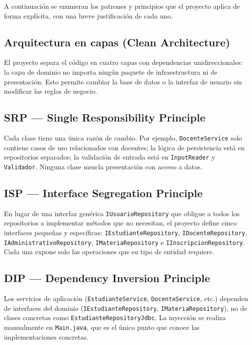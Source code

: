 \documentclass[12pt,a4paper]{article}
\begin{document}
A continuación se enumeran los patrones y principios que el proyecto aplica
de forma explícita, con una breve justificación de cada uno.

\subsection*{Arquitectura en capas (Clean Architecture)}

El proyecto separa el código en cuatro capas con dependencias
unidireccionales: la capa de dominio no importa ningún paquete de
infraestructura ni de presentación. Esto permite cambiar la base de datos o
la interfaz de usuario sin modificar las reglas de negocio.

\subsection*{SRP --- Single Responsibility Principle}

Cada clase tiene una única razón de cambio. Por ejemplo,
\texttt{DocenteService} solo contiene casos de uso relacionados con
docentes; la lógica de persistencia está en repositorios separados; la
validación de entrada está en \texttt{InputReader} y \texttt{Validador}.
Ninguna clase mezcla presentación con acceso a datos.

\subsection*{ISP --- Interface Segregation Principle}

En lugar de una interfaz genérica \texttt{IUsuarioRepository} que obligue a
todos los repositorios a implementar métodos que no necesitan, el proyecto
define cinco interfaces pequeñas y específicas:
\texttt{IEstudianteRepository}, \texttt{IDocenteRepository},
\texttt{IAdministrativoRepository}, \texttt{IMateriaRepository} e
\texttt{IInscripcionRepository}. Cada una expone solo las operaciones que
su tipo de entidad requiere.

\subsection*{DIP --- Dependency Inversion Principle}

Los servicios de aplicación (\texttt{EstudianteService},
\texttt{DocenteService}, etc.) dependen de interfaces del dominio
(\texttt{IEstudianteRepository}, \texttt{IMateriaRepository}), no de clases
concretas como \texttt{EstudianteRepositoryJdbc}. La inyección se realiza
manualmente en \texttt{Main.java}, que es el único punto que conoce las
implementaciones concretas.
\end{document}
